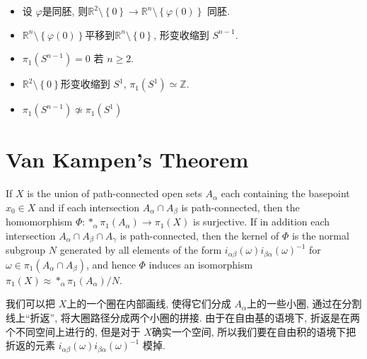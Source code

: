 \documentclass[../main.tex]{subfiles}
\begin{document}
\begin{proofsketch}
   \begin{itemize}
    \item 设 \(   \varphi   \)是同胚, 则\(  \mathbb{R} ^{2}\setminus \left\{ 0 \right\}  \to  \mathbb{R} ^{n}\setminus \left\{  \varphi \left( 0 \right)  \right\}\)   同胚.
    \item   \(  \mathbb{R} ^{n}\setminus \left\{  \varphi \left( 0 \right)  \right\}  \)平移到\(  \mathbb{R} ^{n}\setminus \left\{ 0 \right\}  \),  形变收缩到 \(  S^{n-1}  \). 
    \item \(   \pi _1 \left( S^{n-1} \right)= 0   \) 若 \(  n\ge 2  \).   
    \item \(  \mathbb{R} ^{2}\setminus \left\{ 0 \right\}  \)形变收缩到 \(  S^{1}  \), \(   \pi _1 \left( S^{1} \right)\simeq  \mathbb{Z}    \).  
    \item \(   \pi _1 \left( S^{n-1} \right)\not \simeq  \pi _1 \left( S^{1} \right)    \)  
   \end{itemize}
 
\end{proofsketch}

\section{Van Kampen's Theorem}

\begin{theorem}{}{}
If $X$ is the union of path-connected open sets $A_{\alpha}$ each containing the basepoint $x_{0}\in X$ and if each intersection $A_{\alpha}\cap A_{\beta}$ is path-connected, then the homomorphism $\Phi\colon \ast_{\alpha}\pi_{1}(A_{\alpha})\to\pi_{1}(X)$ is surjective. If in addition each intersection $A_{\alpha}\cap A_{\beta}\cap A_{\gamma}$ is path-connected, then the kernel of $\Phi$ is the normal subgroup $N$ generated by all elements of the form $i_{\alpha\beta}(\omega)i_{\beta\alpha}(\omega)^{-1}$ for $\omega\in\pi_{1}(A_{\alpha}\cap A_{\beta})$, and hence $\Phi$ induces an isomorphism $\pi_{1}(X)\approx\ast_{\alpha}\pi_{1}(A_{\alpha})/N$.
\end{theorem}

\begin{note}
    我们可以把 \(  X  \)上的一个圈在内部画线,  使得它们分成 \(  A_{\alpha }  \)上的一些小圈, 通过在分割线上``折返'', 将大圈路径分成两个小圈的拼接. 由于在自由基的语境下, 折返是在两个不同空间上进行的, 但是对于 \(  X  \)确实一个空间, 所以我们要在自由积的语境下把折返的元素 \(  i_{\alpha \beta }\left(  \omega  \right)i_{\beta \alpha }\left(  \omega  \right)^{-1}     \) 模掉. 
\end{note}
\end{document}
